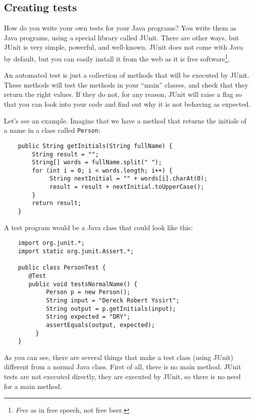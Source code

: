 \subsection{Creating tests}
\label{sec:creating-tests}

How do you write your own tests for your Java programs? You write them
as Java programs, using a special library called JUnit. There are
other ways, but JUnit is very simple, powerful, and well-known. JUnit
does not come with Java by default, but you can easily install it from
the web as it is free software\footnote{\emph{Free} as in free speech,
not free beer.}. 

An automated test is just a collection of methods that will be
executed by JUnit. These methods will test the methods in your
``main'' classes, and check that they return the right values. If they
do not, for any reason, JUnit will raise a flag so that you can look
into your code and find out why it is not behaving as expected. 

Let's see an example. Imagine that we have 
a method that returns the initials of a name
in a class called \verb+Person+: 

\begin{verbatim}
    public String getInitials(String fullName) {
        String result = "";
        String[] words = fullName.split(" ");
        for (int i = 0; i < words.length; i++) {
             String nextInitial = "" + words[i].charAt(0);
             result = result + nextInitial.toUpperCase();
        }
        return result;
    }
\end{verbatim}

A test program would be a Java class that could look like this: 

\begin{verbatim}
    import org.junit.*;
    import static org.junit.Assert.*;
    
    public class PersonTest {
       @Test
       public void testsNormalName() {
            Person p = new Person();
            String input = "Dereck Robert Yssirt";
            String output = p.getInitials(input);
            String expected = "DRY";
            assertEquals(output, expected);
         }
    }
\end{verbatim}

As you can see, there are several things that make a test class (using
JUnit) different from a normal Java class. First of all, there is no
main method. JUnit tests are not executed directly, they are executed
by JUnit, so there is no need for a main method. 

